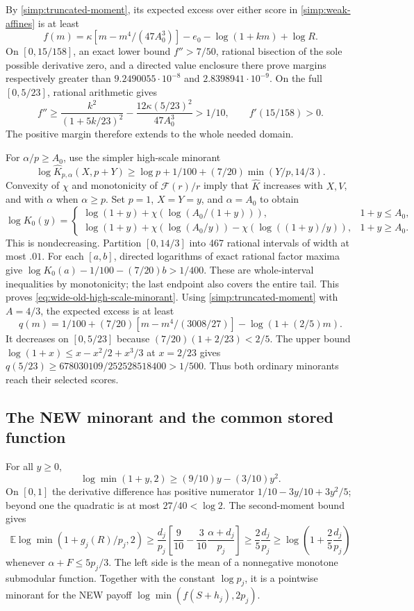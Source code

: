 By \eqref{simp:truncated-moment}, its expected excess over either score
in \eqref{simp:weak-affines} is at least
\[
 f(m)=\kappa[m-m^4/(47A_0^3)]-e_0-\log(1+km)+\log R.
\]
On $[0,15/158]$, an exact lower bound $f''>7/50$, rational bisection of
the sole possible derivative zero, and a directed value enclosure there
prove margins respectively greater than $9.2490055\cdot10^{-8}$ and
$2.8398941\cdot10^{-9}$. On the full $[0,5/23]$, rational arithmetic gives
\[
 f''\ge\frac{k^2}{(1+5k/23)^2}
       -\frac{12\kappa(5/23)^2}{47A_0^3}>1/10,
 \qquad f'(15/158)>0.
\]
The positive margin therefore extends to the whole needed domain.

For $\alpha/p\ge A_0$, use the simpler high-scale minorant
\begin{equation}\label{eq:wide-old-high-scale-minorant}
 \log\widehat K_{p,\alpha}(X,p+Y)
 \ge\log p+1/100+(7/20)\min(Y/p,14/3).
\end{equation}
Convexity of $\chi$ and monotonicity of $\mathcal F(r)/r$ imply that
$\widehat K$ increases with $X,V$, and with $\alpha$ when $\alpha\ge p$.
Set $p=1$, $X=Y=y$, and $\alpha=A_0$ to obtain
\[
 \log K_0(y)=\begin{cases}
 \log(1+y)+\chi(\log(A_0/(1+y))),&1+y\le A_0,\\
 \log(1+y)+\chi(\log(A_0/y))-\chi(\log((1+y)/y)),&1+y\ge A_0.
 \end{cases}
\]
This is nondecreasing. Partition $[0,14/3]$ into 467 rational intervals
of width at most $.01$. For each $[a,b]$, directed logarithms of exact
rational factor maxima give
$\log K_0(a)-1/100-(7/20)b>1/400$.
These are whole-interval inequalities by monotonicity; the last endpoint
also covers the entire tail. This proves \eqref{eq:wide-old-high-scale-minorant}.
Using \eqref{simp:truncated-moment} with $A=4/3$, the expected excess
is at least
\[
 q(m)=1/100+(7/20)[m-m^4/(3008/27)]-\log(1+(2/5)m).
\]
It decreases on $[0,5/23]$ because $(7/20)(1+2/23)<2/5$.
The upper bound $\log(1+x)\le x-x^2/2+x^3/3$ at $x=2/23$ gives
$q(5/23)\ge678030109/252528518400>1/500$.
Thus both ordinary minorants reach their selected scores.

\subsection{The NEW minorant and the common stored function}

For all $y\ge0$,
\[
 \log\min(1+y,2)\ge(9/10)y-(3/10)y^2.
\]
On $[0,1]$ the derivative difference has positive numerator
$1/10-3y/10+3y^2/5$; beyond one the quadratic is at most
$27/40<\log2$. The second-moment bound gives
\[
 \mathbb E\log\min(1+g_j(R)/p_j,2)
 \ge\frac{d_j}{p_j}\left[\frac9{10}-\frac3{10}\frac{\alpha+d_j}{p_j}\right]
 \ge\frac25\frac{d_j}{p_j}
 \ge\log\left(1+\frac25\frac{d_j}{p_j}\right)
\]
whenever $\alpha+F\le5p_j/3$. The left side is the mean of a
nonnegative monotone submodular function. Together with the constant
$\log p_j$, it is a pointwise minorant for the NEW payoff
$\log\min(f(S+h_j),2p_j)$.

